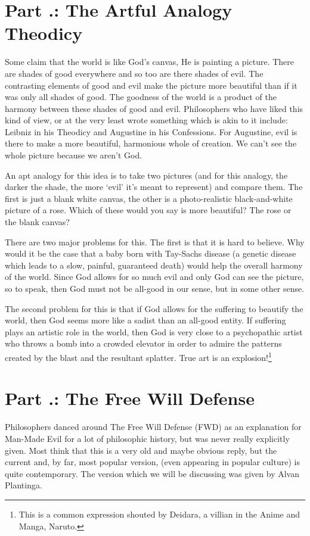 \section{Part \thechapcount.\theseccount: The Artful Analogy Theodicy}
Some claim that the world is like God’s canvas, He is painting a picture. There are shades of good everywhere and so too are there shades of evil. The contrasting elements of good and evil make the picture more beautiful than if it was only all shades of good. The goodness of the world is a product of the harmony between these shades of good and evil. Philosophers who have liked this kind of view, or at the very least wrote something which is akin to it include: Leibniz in his Theodicy\autocite[paragraph number 213]{Leibniz1} and Augustine in his Confessions.\autocite[Book 7, chapters 13-16]{Augustine1} For Augustine, evil is there to make a more beautiful, harmonious whole of creation. We can't see the whole picture because we aren't God. 

An apt analogy for this idea is to take two pictures (and for this analogy, the darker the shade, the more `evil' it's meant to represent) and compare them. The first is just a blank white canvas, the other is a photo-realistic black-and-white picture of a rose. Which of these would you say is more beautiful? The rose or the blank canvas?

There are two major problems for this. The first is that it is hard to believe. Why would it be the case that a baby born with Tay-Sachs disease (a genetic disease which leads to a slow, painful, guaranteed death) would help the overall harmony of the world. Since God allows for so much evil and only God can see the picture, so to speak, then God must not be all-good in our sense, but in some other sense. 

The second problem for this is that if God allows for the suffering to beautify the world, then God seems more like a sadist than an all-good entity. If suffering plays an artistic role in the world, then God is very close to a psychopathic artist who throws a bomb into a crowded elevator in order to admire the patterns created by the blast and the resultant splatter. True art is an explosion!\footnote{This is a common expression shouted by Deidara, a villian in the Anime and Manga, Naruto.}

\section{Part \thechapcount.\theseccount: The Free Will Defense}
Philosophers danced around The Free Will Defense (FWD) as an explanation for Man-Made Evil for a lot of philosophic history, but was never really explicitly given. Most think that this is a very old and maybe obvious reply, but the current and,  by far, most popular version, (even appearing in popular culture) is quite contemporary. The version which we will be discussing was given by Alvan Plantinga.\autocite{Plantinga1}

